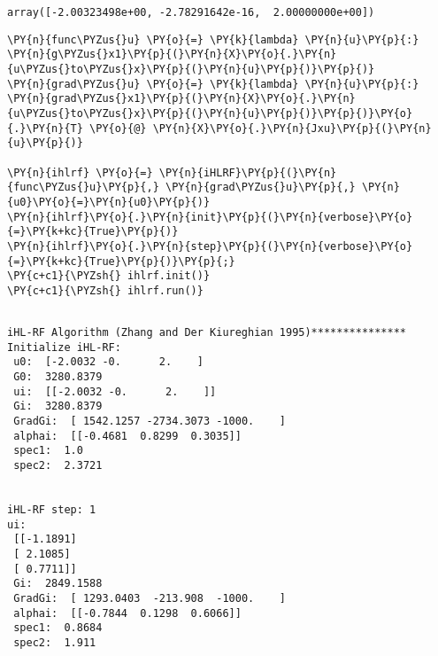             \begin{tcolorbox}[breakable, size=fbox, boxrule=.5pt, pad at break*=1mm, opacityfill=0]
\begin{Verbatim}[commandchars=\\\{\}]
array([-2.00323498e+00, -2.78291642e-16,  2.00000000e+00])
\end{Verbatim}
\end{tcolorbox}
        
    \begin{tcolorbox}[breakable, size=fbox, boxrule=1pt, pad at break*=1mm,colback=cellbackground, colframe=cellborder]
\begin{Verbatim}[commandchars=\\\{\}]
\PY{n}{func\PYZus{}u} \PY{o}{=} \PY{k}{lambda} \PY{n}{u}\PY{p}{:}    \PY{n}{g\PYZus{}x1}\PY{p}{(}\PY{n}{X}\PY{o}{.}\PY{n}{u\PYZus{}to\PYZus{}x}\PY{p}{(}\PY{n}{u}\PY{p}{)}\PY{p}{)}
\PY{n}{grad\PYZus{}u} \PY{o}{=} \PY{k}{lambda} \PY{n}{u}\PY{p}{:} \PY{n}{grad\PYZus{}x1}\PY{p}{(}\PY{n}{X}\PY{o}{.}\PY{n}{u\PYZus{}to\PYZus{}x}\PY{p}{(}\PY{n}{u}\PY{p}{)}\PY{p}{)}\PY{o}{.}\PY{n}{T} \PY{o}{@} \PY{n}{X}\PY{o}{.}\PY{n}{Jxu}\PY{p}{(}\PY{n}{u}\PY{p}{)}

\PY{n}{ihlrf} \PY{o}{=} \PY{n}{iHLRF}\PY{p}{(}\PY{n}{func\PYZus{}u}\PY{p}{,} \PY{n}{grad\PYZus{}u}\PY{p}{,} \PY{n}{u0}\PY{o}{=}\PY{n}{u0}\PY{p}{)}
\PY{n}{ihlrf}\PY{o}{.}\PY{n}{init}\PY{p}{(}\PY{n}{verbose}\PY{o}{=}\PY{k+kc}{True}\PY{p}{)}
\PY{n}{ihlrf}\PY{o}{.}\PY{n}{step}\PY{p}{(}\PY{n}{verbose}\PY{o}{=}\PY{k+kc}{True}\PY{p}{)}\PY{p}{;}
\PY{c+c1}{\PYZsh{} ihlrf.init()}
\PY{c+c1}{\PYZsh{} ihlrf.run()}
\end{Verbatim}
\end{tcolorbox}

    \begin{Verbatim}[commandchars=\\\{\}]

iHL-RF Algorithm (Zhang and Der Kiureghian 1995)***************
Initialize iHL-RF:
 u0:  [-2.0032 -0.      2.    ]
 G0:  3280.8379
 ui:  [[-2.0032 -0.      2.    ]]
 Gi:  3280.8379
 GradGi:  [ 1542.1257 -2734.3073 -1000.    ]
 alphai:  [[-0.4681  0.8299  0.3035]]
 spec1:  1.0
 spec2:  2.3721


iHL-RF step: 1
ui:
 [[-1.1891]
 [ 2.1085]
 [ 0.7711]]
 Gi:  2849.1588
 GradGi:  [ 1293.0403  -213.908  -1000.    ]
 alphai:  [[-0.7844  0.1298  0.6066]]
 spec1:  0.8684
 spec2:  1.911

    \end{Verbatim}

